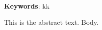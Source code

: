 \documentclass{article}
\def\abstract{This is the abstract text.}
\newenvironment{IJSRAabstract}{\list{}{\rightmargin\leftmargin}\item \textbf{Keywords}: kk\\ \itshape\noindent\item\relax}{\endlist}
\begin{document}
\begin{IJSRAabstract}
\abstract
\end{IJSRAabstract}
Body.
\end{document}
